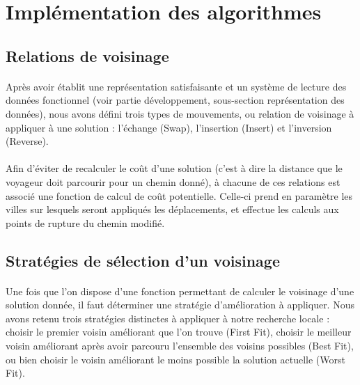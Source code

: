 \documentclass[a4paper,10pt]{report}
\begin{document}
\section{Implémentation des algorithmes}
\subsection{Relations de voisinage}

\paragraph{}
  Après avoir établit une représentation satisfaisante et un système de lecture
des données fonctionnel (voir partie développement, sous-section représentation
des données), nous avons défini trois types de mouvements, ou relation de
voisinage à appliquer à une solution : l'échange (Swap), l'insertion (Insert) et
l'inversion (Reverse).

\paragraph{}
Afin d'éviter de recalculer le coût d'une solution (c'est à dire la distance que
le voyageur doit parcourir pour un chemin donné), à chacune de ces relations est
associé une fonction de calcul de coût potentielle. Celle-ci prend en paramètre
les villes sur lesquels seront appliqués les déplacements, et effectue les
calculs aux points de rupture du chemin modifié.


\subsection{Stratégies de sélection d'un voisinage}

\paragraph{}
  Une fois que l'on dispose d'une fonction permettant de calculer le voisinage
d'une solution donnée, il faut déterminer une stratégie d'amélioration à
appliquer. Nous avons retenu trois stratégies distinctes à appliquer à notre
recherche locale : choisir le premier voisin améliorant que l'on trouve (First
Fit), choisir le meilleur voisin améliorant après avoir parcouru l'ensemble des
voisins possibles (Best Fit), ou bien choisir le voisin améliorant le moins
possible la solution actuelle (Worst Fit).
\end{document}
